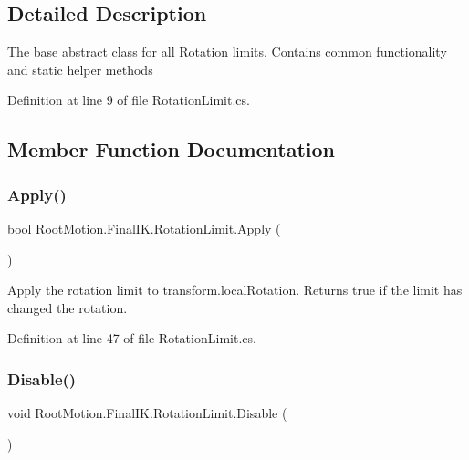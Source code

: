 \subsection{Detailed Description}
The base abstract class for all Rotation limits. Contains common functionality and static helper methods 



Definition at line 9 of file Rotation\+Limit.\+cs.



\subsection{Member Function Documentation}
\mbox{\label{class_root_motion_1_1_final_i_k_1_1_rotation_limit_a3b12e3e65a87ae641c537fea1593d02e}} 
\subsubsection{\texorpdfstring{Apply()}{Apply()}}
{\footnotesize\ttfamily bool Root\+Motion.\+Final\+I\+K.\+Rotation\+Limit.\+Apply (\begin{DoxyParamCaption}{ }\end{DoxyParamCaption})}



Apply the rotation limit to transform.\+local\+Rotation. Returns true if the limit has changed the rotation. 



Definition at line 47 of file Rotation\+Limit.\+cs.

\mbox{\label{class_root_motion_1_1_final_i_k_1_1_rotation_limit_a421593ab0920f61dea2ca91ba16ed602}} 
\subsubsection{\texorpdfstring{Disable()}{Disable()}}
{\footnotesize\ttfamily void Root\+Motion.\+Final\+I\+K.\+Rotation\+Limit.\+Disable (\begin{DoxyParamCaption}{ }\end{DoxyParamCaption})}



